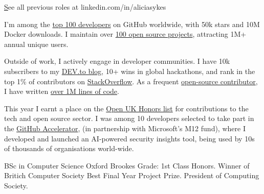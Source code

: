 \documentclass[]{resume-format}
\begin{document}
    \vspace{-5mm}
    \begin{flushright}
        \small\color{lightgray} \href{ https://linkedin.com/in/aliciasykes }See all previous roles at linkedin.com/in/aliciasykes
    \end{flushright}




\begin{cvachievements}
    \item { I'm among the \href{https://gitstar-ranking.com/Lissy93}{top 100 developers} on GitHub worldwide, with 50k stars and 10M Docker downloads. I maintain over \href{https://apps.aliciasykes.com/}{100 open source projects}, attracting 1M+ annual unique users. }
    \item { Outside of work, I actively engage in developer communities. I have 10k subscribers to my \href{https://dev.to/lissy93}{DEV.to blog}, 10+ wins in global hackathons, and rank in the top 1\% of contributors on \href{https://stackoverflow.com/users/979052/alicia-sykes}{StackOverflow}. As a frequent \href{https://github.com/lissy93}{open-source contributor}, I have written \href{https://codestats.net/users/alicia}{over 1M lines of code}. }
    \item { This year I earnt a place on the \href{https://openuk.uk/community/openuk-honours-lists/2024-honours-list/}{Open UK Honors list} for contributions to the tech and open source sector. I was among 10 developers selected to take part in the \href{https://github.blog/news-insights/company-news/2024-github-accelerator-meet-the-11-projects-shaping-open-source-ai/#web-check-bringing-security-to-the-web}{GitHub Accelerator}, (in partnership with Microsoft's M12 fund), where I developed and launched an AI-powered security insights tool, being used by 10s of thousands of organisations world-wide. }
\end{cvachievements}



\begin{cventries}
    \cventry
    { BSc in Computer Science }
    { Oxford Brookes }
    {}
    {}
    {Grade: 1st Class Honors. Winner of Britich Computer Society Best Final Year Project Prize. President of Computing Society.}
\end{cventries}
\end{document}
